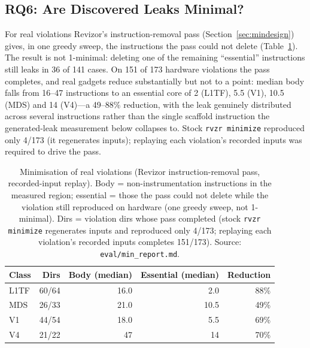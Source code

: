 \documentclass[conference]{IEEEtran}
\begin{document}

\subsection{RQ6: Are Discovered Leaks Minimal?}
\label{sec:min}
For real violations Revizor's instruction-removal pass (Section~\ref{sec:mindesign})
gives, in one greedy sweep, the instructions the pass could not delete
(Table~\ref{tab:min}). The result is not 1-minimal: deleting one of the
remaining ``essential'' instructions still leaks in 36 of 141 cases. On 151 of 173
hardware violations the pass completes, and real gadgets reduce substantially
but not to a point: median body falls from 16--47 instructions to an essential
core of 2 (L1TF), 5.5 (V1), 10.5 (MDS) and 14 (V4)---a 49--88\% reduction, with
the leak genuinely distributed across several instructions rather than the
single scaffold instruction the generated-leak measurement below collapses to.
Stock \texttt{rvzr minimize} reproduced only 4/173 (it regenerates inputs);
replaying each violation's recorded inputs was required to drive the pass.

\begin{table}[t]
\centering
\caption{Minimisation of real violations (Revizor instruction-removal pass,
  recorded-input replay). Body = non-instrumentation instructions in the
  measured region; essential = those the pass could not delete while the
  violation still reproduced on hardware (one greedy sweep, not 1-minimal).
  Dirs = violation dirs whose pass
  completed (stock \texttt{rvzr minimize} regenerates inputs and reproduced
  only 4/173; replaying each violation's recorded inputs completes 151/173).
  Source: \texttt{eval/min\_report.md}.}
\label{tab:min}
\footnotesize
\begin{tabular}{@{}lrrrr@{}}
\toprule
Class & Dirs & Body (median) & Essential (median) & Reduction \\
\midrule
L1TF & 60/64 & 16.0 & 2.0  & 88\% \\
MDS  & 26/33 & 21.0 & 10.5 & 49\% \\
V1   & 44/54 & 18.0 & 5.5  & 69\% \\
V4   & 21/22 & 47   & 14   & 70\% \\
\bottomrule
\end{tabular}
\end{table}
\end{document}
